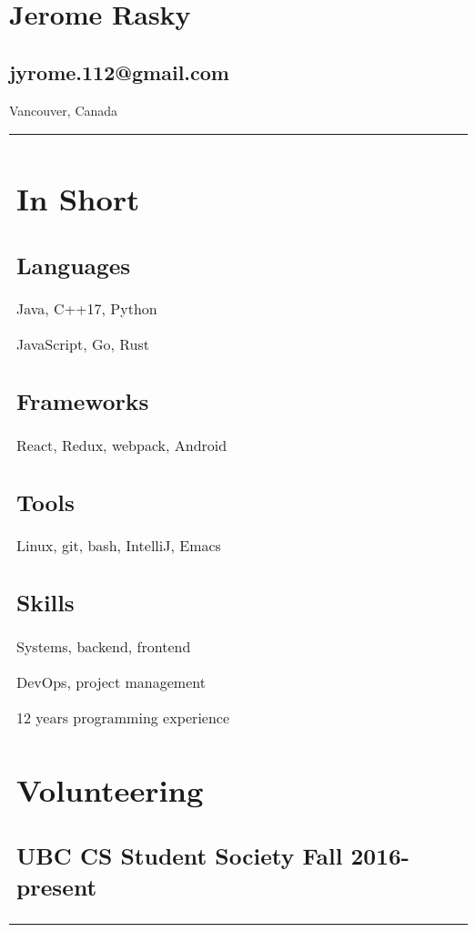 \documentclass[letterpaper]{article}
\newlength{\leftcol}
\newlength{\rightcol}
\newcommand{\subtitle}{\normalfont\sffamily\color{black}\large}
\begin{document}
\sffamily
\large
{}

\section*{\Huge Jerome Rasky}
\subsection*{jyrome.112@gmail.com}

Vancouver, Canada

\begin{tabularx}{\textwidth}{@{}p{\leftcol} p{\rightcol}}
\section*{In Short}
\subsection*{Languages}

Java, C++17, Python

JavaScript, Go, Rust

\subsection*{Frameworks}

React, Redux, webpack, Android

\subsection*{Tools}

Linux, git, bash, IntelliJ, Emacs

\subsection*{Skills}

Systems, backend, frontend

DevOps, project management

12 years programming experience

\section*{Volunteering}

\subsection*{UBC CS Student Society \newline\subtitle Fall 2016-present}


\end{tabularx}
\end{document}
